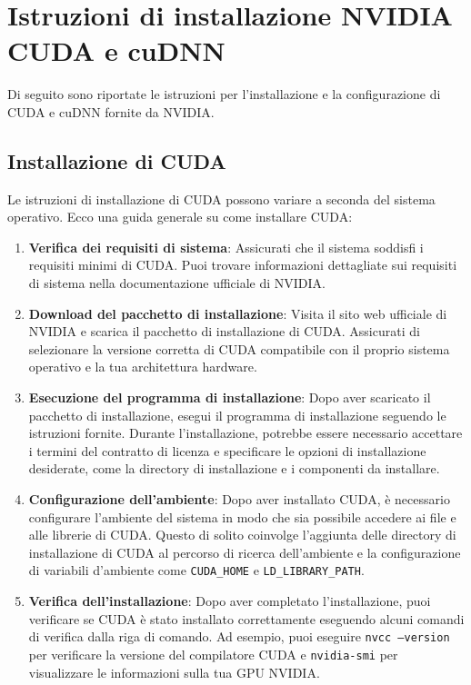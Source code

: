 \documentclass{article}
\begin{document}
\section{Istruzioni di installazione NVIDIA CUDA e cuDNN}
\label{appendix:installazione-nvidia}

Di seguito sono riportate le istruzioni per l'installazione e la configurazione di CUDA e cuDNN fornite da NVIDIA.

\subsection{Installazione di CUDA}
Le istruzioni di installazione di CUDA possono variare a seconda del sistema operativo.
Ecco una guida generale su come installare CUDA:

\begin{enumerate}
    \item \textbf{Verifica dei requisiti di sistema}: Assicurati che il sistema soddisfi i requisiti minimi di CUDA. Puoi trovare informazioni dettagliate sui requisiti di sistema nella documentazione ufficiale di NVIDIA.
    
    \item \textbf{Download del pacchetto di installazione}: Visita il sito web ufficiale di NVIDIA e scarica il pacchetto di installazione di CUDA. Assicurati di selezionare la versione corretta di CUDA compatibile con il proprio sistema operativo e la tua architettura hardware.
    
    \item \textbf{Esecuzione del programma di installazione}: Dopo aver scaricato il pacchetto di installazione, esegui il programma di installazione seguendo le istruzioni fornite. Durante l'installazione, potrebbe essere necessario accettare i termini del contratto di licenza e specificare le opzioni di installazione desiderate, come la directory di installazione e i componenti da installare.
    
    \item \textbf{Configurazione dell'ambiente}: Dopo aver installato CUDA, è necessario configurare l'ambiente del sistema in modo che sia possibile accedere ai file e alle librerie di CUDA. Questo di solito coinvolge l'aggiunta delle directory di installazione di CUDA al percorso di ricerca dell'ambiente e la configurazione di variabili d'ambiente come \texttt{CUDA\_HOME} e \texttt{LD\_LIBRARY\_PATH}.
    
    \item \textbf{Verifica dell'installazione}: Dopo aver completato l'installazione, puoi verificare se CUDA è stato installato correttamente eseguendo alcuni comandi di verifica dalla riga di comando. Ad esempio, puoi eseguire \texttt{nvcc --version} per verificare la versione del compilatore CUDA e \texttt{nvidia-smi} per visualizzare le informazioni sulla tua GPU NVIDIA.
\end{enumerate}
\end{document}
